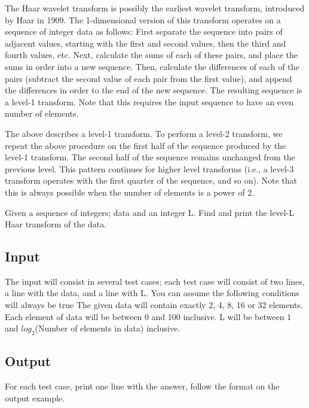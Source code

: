 The Haar wavelet transform is possibly the earliest wavelet transform, introduced by Haar in 1909. The 1-dimensional version of this transform operates on a sequence of integer data as follows: First separate the sequence into pairs of adjacent values, starting with the first and second values, then the third and fourth values, etc. Next, calculate the sums of each of these pairs, and place the sums in order into a new sequence. Then, calculate the differences of each of the pairs (subtract the second value of each pair from the first value), and append the differences in order to the end of the new sequence. The resulting sequence is a level-1 transform. Note that this requires the input sequence to have an even number of elements. 

The above describes a level-1 transform. To perform a level-2 transform, we repeat the above procedure on the first half of the sequence produced by the level-1 transform. The second half of the sequence remains unchanged from the previous level. This pattern continues for higher level transforms (i.e., a level-3 transform operates with the first quarter of the sequence, and so on). Note that this is always possible when the number of elements is a power of 2. 

Given a sequence of integers; data and an integer L. Find and print the level-L Haar transform of the data.
 

\subsection* {Input}

The input will consist in several test cases; each test case will consist of two lines, a line with the data, and a line with L. You can assume the following conditions will always be true	
The given data will contain exactly 2, 4, 8, 16 or 32 elements.
Each element of data will be between 0 and 100 inclusive.
L will be between 1 and $log_2$(Number of elements in data) inclusive.

\subsection* {Output}

For each test case, print one line with the answer, follow the format on the output example.

\outputnotice

